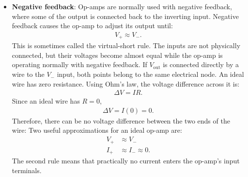 \documentclass{report}
\begin{document}
\begin{itemize}
\begin{itemize}
                \item Positive power supply
                \item Negative power supply or ground
                \item Non-inverting input
                \item Inverting input
                \item Output
            \end{itemize}
            An operational amplifier (op-amp) is called "operational" because it was originally designed to perform mathematical operations (like addition, subtraction, integration, and differentiation) in analog computers, not because its output voltage exceeds its input voltage
        \item \textbf{Negative feedback}: Op-amps are normally used with negative feedback, where some of the output is connected back to the inverting input.
            \bigbreak \noindent 
            Negative feedback causes the op-amp to adjust its output until:
            \begin{align*}
                V_{+} \approx V_{-}
            .\end{align*}
            This is sometimes called the virtual-short rule. The inputs are not physically connected, but their voltages become almost equal while the op-amp is operating normally with negative feedback.
            \bigbreak \noindent 
            If $V_{\text{out}}$ is connected directly by a wire to the $V_{-}$ input, both points belong to the same electrical node. An ideal wire has zero resistance. Using Ohm’s law, the voltage difference across it is:
            \begin{align*}
                \Delta V = IR
            .\end{align*}
            Since an ideal wire has $R = 0$, 
            \begin{align*}
                \Delta V = I(0) = 0
            .\end{align*}
            Therefore, there can be no voltage difference between the two ends of the wire:
            \bigbreak \noindent 
            Two useful approximations for an ideal op-amp are:
            \begin{align*}
                V_{+} &\approx V_{-} \\
                I_{+} &\approx I_{-} \approx  0
            .\end{align*}
            The second rule means that practically no current enters the op-amp’s input terminals.

\end{itemize}
\end{document}
